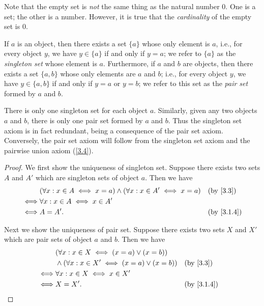 \begin{rmk}\label{3.1.8}
  Note that the empty set is \emph{not} the same thing as the natural number \(0\).
  One is a set;
  the other is a number.
  However, it is true that the \emph{cardinality} of the empty set is \(0\).
\end{rmk}

\begin{ax}\label{3.3}
  If \(a\) is an object, then there exists a set \(\{a\}\) whose only element is \(a\), i.e., for every object \(y\), we have \(y \in \{a\}\) if and only if \(y = a\);
  we refer to \(\{a\}\) as the \emph{singleton set} whose element is \(a\).
  Furthermore, if \(a\) and \(b\) are objects, then there exists a set \(\{a, b\}\) whose only elements are \(a\) and \(b\);
  i.e., for every object \(y\), we have \(y \in \{a, b\}\) if and only if \(y = a\) or \(y = b\);
  we refer to this set as the \emph{pair set} formed by \(a\) and \(b\).
\end{ax}

\begin{rmk}\label{3.1.9}
  There is only one singleton set for each object \(a\).
  Similarly, given any two objects \(a\) and \(b\), there is only one pair set formed by \(a\) and \(b\).
  Thus the singleton set axiom is in fact redundant, being a consequence of the pair set axiom.
  Conversely, the pair set axiom will follow from the singleton set axiom and the pairwise union axiom (\cref{3.4}).
\end{rmk}

\begin{proof}
  We first show the uniqueness of singleton set.
  Suppose there exists two sets \(A\) and \(A'\) which are singleton sets of object \(a\).
  Then we have
  \begin{align*}
         & (\forall x : x \in A \iff x = a) \land (\forall x : x \in A' \iff x = a) &  & \text{(by \cref{3.3})} \\
    \iff & \forall x : x \in A \iff x \in A'                                                                    \\
    \iff & A = A'.                                                                  &  & \by{3.1.4}
  \end{align*}

  Next we show the uniqueness of pair set.
  Suppose there exists two sets \(X\) and \(X'\) which are pair sets of object \(a\) and \(b\).
  Then we have
  \begin{align*}
         & (\forall x : x \in X \iff (x = a) \lor (x = b))                                    \\
         & \land (\forall x : x \in X' \iff (x = a) \lor (x = b)) &  & \text{(by \cref{3.3})} \\
    \iff & \forall x : x \in X \iff x \in X'                                                  \\
    \iff & X = X'.                                                &  & \by{3.1.4}
  \end{align*}
\end{proof}

